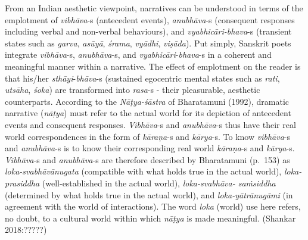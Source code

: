 \begin{myquote}
From an Indian aesthetic viewpoint, narratives can be understood in terms of the emplotment of \textsl{vibhāva}-s (antecedent events), \textsl{anubhāva}-s (consequent responses including verbal and non-verbal behaviours), and \textsl{vyabhicāri-bhava}-s (transient states such as \textsl{garva}, \textsl{asūyā}, \textsl{śrama}, \textsl{vyādhi}, \textsl{viṣāda}). Put simply, Sanskrit poets integrate \textsl{vibhāva}-s, \textsl{anubhāva}-s, and \textsl{vyabhicāri}-\textsl{bhava}-s in a coherent and meaningful manner within a narrative. The effect of emplotment on the reader is that his/her \textsl{sthāyi}-\textsl{bhāva}-s (sustained egocentric mental states such as \textsl{rati}, \textsl{utsāha}, \textsl{śoka}) are transformed into \textsl{rasa}-s - their pleasurable, aesthetic counterparts. According to the \textsl{Nāṭya-śāstra} of Bharatamuni (1992), dramatic narrative (\textsl{nāṭya}) must refer to the actual world for its depiction of antecedent events and consequent responses. \textsl{Vibhāva}-s and \textsl{anubhāva}-s thus have their real world correspondences in the form of \textsl{kāraṇa}-s and \textsl{kārya}-s. To know \textsl{vibhāva}-s and \textsl{anubhāva}-s is to know their corresponding real world \textsl{kāraṇa}-s and \textsl{kārya}-s. \textsl{Vibhāva}-s and \textsl{anubhāva}-s are therefore described by Bharatamuni (p.~153) as \textsl{loka-svabhāvānugata} (compatible with what holds true in the actual world), \textsl{loka-prasiddha} (well-established in the actual world), \textsl{loka-svabhāva- saṁsiddha} (determined by what holds true in the actual world), and \textsl{loka-yātrānugāmi} (in agreement with the world of interactions). The word \textsl{loka} (world) use here refers, no doubt, to a cultural world within which \textsl{nāṭya} is made meaningful. 
\hfill(Shankar 2018:?????) 
\end{myquote}

